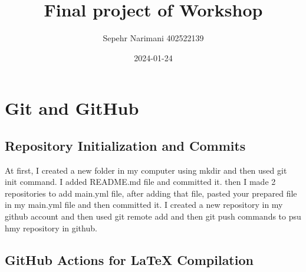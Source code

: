 \documentclass[titlepage]{article}
\title{Final project of Workshop}
\author{Sepehr Narimani 402522139}
\date{2024-01-24}
\begin{document}
	\maketitle
	\pagestyle{fancy}
	
	\section{Git and GitHub}
	\subsection{Repository Initialization and Commits}
	At first, I created a new folder in my computer using mkdir and then used git init command. I added README.md file and committed it. then I made 2 repositories to  add main.yml file, after adding that file, pasted your prepared file in my main.yml file and then committed it. I created a new repository in my github account and then used git remote add and then git push commands to psu hmy repository in github.
	\subsection{ GitHub Actions for LaTeX Compilation}
	
	
	
\end{document}
